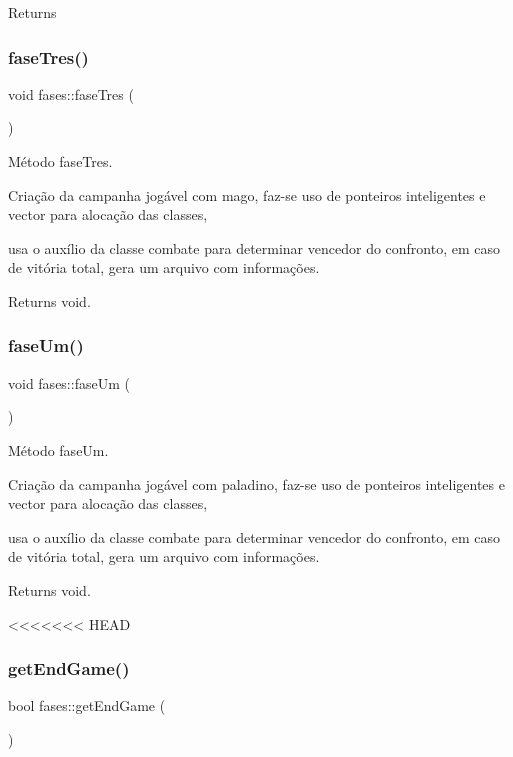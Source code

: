 \begin{DoxyReturn}{Returns}
\subsubsection{\texorpdfstring{fase\+Tres()}{faseTres()}}
{\footnotesize\ttfamily void fases\+::fase\+Tres (\begin{DoxyParamCaption}{ }\end{DoxyParamCaption})}



Método fase\+Tres. 

Criação da campanha jogável com mago, faz-\/se uso de ponteiros inteligentes e vector para alocação das classes,

usa o auxílio da classe combate para determinar vencedor do confronto, em caso de vitória total, gera um arquivo com informações. \begin{DoxyReturn}{Returns}
void. 
\end{DoxyReturn}
\mbox{\label{classfases_a89059232b76460277f9846fc6d66488c}} 
\subsubsection{\texorpdfstring{fase\+Um()}{faseUm()}}
{\footnotesize\ttfamily void fases\+::fase\+Um (\begin{DoxyParamCaption}{ }\end{DoxyParamCaption})}



Método fase\+Um. 

Criação da campanha jogável com paladino, faz-\/se uso de ponteiros inteligentes e vector para alocação das classes,

usa o auxílio da classe combate para determinar vencedor do confronto, em caso de vitória total, gera um arquivo com informações. \begin{DoxyReturn}{Returns}
void. 
\end{DoxyReturn}
<<<<<<< HEAD
\mbox{\label{classfases_aedbb30c3e8ad0b50e96561029aecdf4a}} 
\subsubsection{\texorpdfstring{get\+End\+Game()}{getEndGame()}}
{\footnotesize\ttfamily bool fases\+::get\+End\+Game (\begin{DoxyParamCaption}{ }\end{DoxyParamCaption})}




\end{DoxyReturn}
